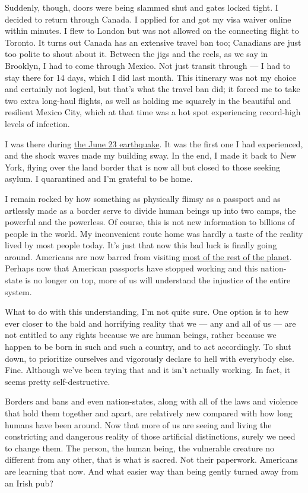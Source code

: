 Suddenly, though, doors were being slammed shut and gates locked tight.
I decided to return through Canada. I applied for and got my visa waiver
online within minutes. I flew to London but was not allowed on the
connecting flight to Toronto. It turns out Canada has an extensive
travel ban too; Canadians are just too polite to shout about it. Between
the jigs and the reels, as we say in Brooklyn, I had to come through
Mexico. Not just transit through --- I had to stay there for 14 days,
which I did last month. This itinerary was not my choice and certainly
not logical, but that's what the travel ban did; it forced me to take
two extra long-haul flights, as well as holding me squarely in the
beautiful and resilient Mexico City, which at that time was a hot spot
experiencing record-high levels of infection.

I was there during
\href{https://www.nytimes.com/2020/06/23/world/mexico-earthquake.html}{the
June 23 earthquake}. It was the first one I had experienced, and the
shock waves made my building sway. In the end, I made it back to New
York, flying over the land border that is now all but closed to those
seeking asylum. I quarantined and I'm grateful to be home.

I remain rocked by how something as physically flimsy as a passport and
as artlessly made as a border serve to divide human beings up into two
camps, the powerful and the powerless. Of course, this is not new
information to billions of people in the world. My inconvenient route
home was hardly a taste of the reality lived by most people today. It's
just that now this bad luck is finally going around. Americans are now
barred from visiting
\href{https://www.cnn.com/travel/article/us-international-travel-covid-19/index.html}{most
of the rest of the planet}. Perhaps now that American passports have
stopped working and this nation-state is no longer on top, more of us
will understand the injustice of the entire system.

What to do with this understanding, I'm not quite sure. One option is to
hew ever closer to the bald and horrifying reality that we --- any and
all of us --- are not entitled to any rights because we are human
beings, rather because we happen to be born in such and such a country,
and to act accordingly. To shut down, to prioritize ourselves and
vigorously declare to hell with everybody else. Fine. Although we've
been trying that and it isn't actually working. In fact, it seems pretty
self-destructive.

Borders and bans and even nation-states, along with all of the laws and
violence that hold them together and apart, are relatively new compared
with how long humans have been around. Now that more of us are seeing
and living the constricting and dangerous reality of those artificial
distinctions, surely we need to change them. The person, the human
being, the vulnerable creature no different from any other, that is what
is sacred. Not their paperwork. Americans are learning that now. And
what easier way than being gently turned away from an Irish pub?

